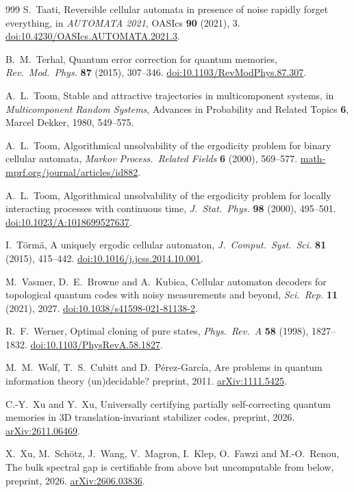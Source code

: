 \begin{thebibliography}{999}
S.~Taati,
Reversible cellular automata in presence of noise rapidly forget everything,
in \emph{AUTOMATA 2021}, OASIcs \textbf{90} (2021), 3.
\href{https://doi.org/10.4230/OASIcs.AUTOMATA.2021.3}{doi:10.4230/OASIcs.AUTOMATA.2021.3}.

B.~M.~Terhal,
Quantum error correction for quantum memories,
\emph{Rev.~Mod.~Phys.} \textbf{87} (2015), 307--346.
\href{https://doi.org/10.1103/RevModPhys.87.307}{doi:10.1103/RevModPhys.87.307}.

A.~L.~Toom,
Stable and attractive trajectories in multicomponent systems,
in \emph{Multicomponent Random Systems},
Advances in Probability and Related Topics \textbf{6},
Marcel Dekker, 1980, 549--575.

A.~L.~Toom,
Algorithmical unsolvability of the ergodicity problem for binary cellular automata,
\emph{Markov Process.~Related Fields} \textbf{6} (2000), 569--577.
\href{https://math-mprf.org/journal/articles/id882/}{math-mprf.org/journal/articles/id882}.

A.~L.~Toom,
Algorithmical unsolvability of the ergodicity problem for locally interacting processes with continuous time,
\emph{J.~Stat.~Phys.} \textbf{98} (2000), 495--501.
\href{https://doi.org/10.1023/A:1018699527637}{doi:10.1023/A:1018699527637}.

I.~T\"orm\"a,
A uniquely ergodic cellular automaton,
\emph{J.~Comput.~Syst.~Sci.} \textbf{81} (2015), 415--442.
\href{https://doi.org/10.1016/j.jcss.2014.10.001}{doi:10.1016/j.jcss.2014.10.001}.

M.~Vasmer, D.~E.~Browne and A.~Kubica,
Cellular automaton decoders for topological quantum codes with noisy measurements and beyond,
\emph{Sci.~Rep.} \textbf{11} (2021), 2027.
\href{https://doi.org/10.1038/s41598-021-81138-2}{doi:10.1038/s41598-021-81138-2}.

R.~F.~Werner,
Optimal cloning of pure states,
\emph{Phys.~Rev.~A} \textbf{58} (1998), 1827--1832.
\href{https://doi.org/10.1103/PhysRevA.58.1827}{doi:10.1103/PhysRevA.58.1827}.

M.~M.~Wolf, T.~S.~Cubitt and D.~P\'erez-Garc\'ia,
Are problems in quantum information theory (un)decidable?
preprint, 2011.
\href{https://arxiv.org/abs/1111.5425}{arXiv:1111.5425}.

C.-Y.~Xu and Y.~Xu,
Universally certifying partially self-correcting quantum memories in 3D translation-invariant stabilizer codes,
preprint, 2026.
\href{https://arxiv.org/abs/2611.06469}{arXiv:2611.06469}.

X.~Xu, M.~Sch\"otz, J.~Wang, V.~Magron, I.~Klep, O.~Fawzi and M.-O.~Renou,
The bulk spectral gap is certifiable from above but uncomputable from below,
preprint, 2026.
\href{https://arxiv.org/abs/2606.03836}{arXiv:2606.03836}.

\end{thebibliography}
